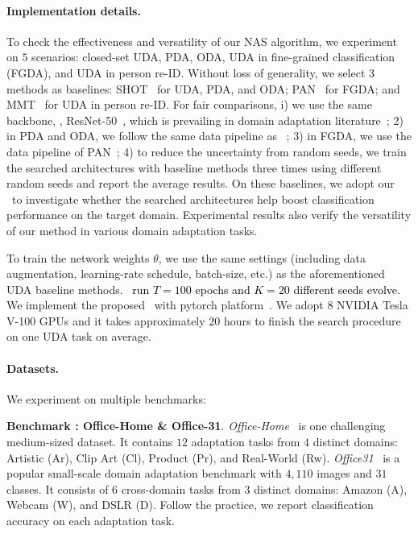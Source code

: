 \documentclass[10pt,twocolumn,letterpaper]{article}
\begin{document}
\paragraph{Implementation details.}
To check the effectiveness and versatility of our NAS algorithm, we experiment on $5$ scenarios: closed-set UDA, PDA, ODA, UDA in fine-grained classification (FGDA), and UDA in person re-ID.
Without loss of generality, we select $3$ \SOTA  methods as baselines: SHOT~\cite{liang2020shot} for UDA, PDA, and ODA; PAN~\cite{wang2020PAN} for FGDA; and MMT~\cite{ge2020MMT} for UDA in person re-ID.
For fair comparisons,
i) we use the same backbone, \ie, ResNet-50~\cite{he2016resnet}, which is prevailing in domain adaptation literature~\cite{long2018CDAN,cui2020BNM,wang2020PAN,ge2020MMT};
2) in PDA and ODA, we follow the same data pipeline as ~\cite{cao2018SAN,cao2019ETN,liu2019STA,liang2020shot};
3) in FGDA, we use the data pipeline of PAN~\cite{wang2020PAN};
4) to reduce the uncertainty from random seeds, we train the searched architectures with baseline methods three times using different random seeds and report the average results.
On these baselines, we adopt our \iMethod\  to investigate whether the searched architectures help boost classification performance on the target domain. Experimental results also verify the versatility of our method in various domain adaptation tasks.

To train the network weights $\theta$, we use the same settings (including data augmentation, learning-rate schedule, batch-size, etc.) as the aforementioned UDA baseline methods.
\textcolor{black}{\iMethod\, run $T=100$ epochs and $K=20$ different seeds evolve.}
We implement the proposed \iMethod\, with pytorch platform~\cite{paszke2019pytorch}.
We adopt $8$ NVIDIA Tesla V-100 GPUs and it takes approximately $20$ hours to finish the search procedure on one UDA task on average.

\vspace{-4mm}
\paragraph{Datasets.} We experiment on multiple benchmarks:

\textbf{Benchmark : Office-Home \& Office-31}.
\textit{Office-Home}~\cite{venkateswara2017officehome} is one challenging medium-sized dataset. It contains $12$ adaptation tasks from $4$ distinct domains: Artistic (Ar), Clip Art (Cl), Product (Pr), and Real-World (Rw).
\textit{Office31}~\cite{saenko2010office31} is a popular small-scale domain adaptation benchmark with $4,110$ images and $31$ classes. It consists of $6$ cross-domain tasks from $3$ distinct domains: Amazon (A), Webcam (W), and DSLR (D).
Follow the practice, we report classification accuracy on each adaptation task.
\end{document}
